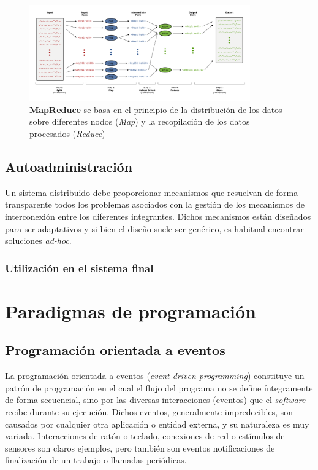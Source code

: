 \begin{figure}[H]
  \centering
  \includegraphics[width=0.85\textwidth]{Chapter2/Figures/map-reduce}
  \caption[MapReduce]{\textbf{MapReduce} se basa en el principio de la distribución de los datos sobre diferentes nodos (\textit{Map}) y la recopilación de los datos procesados (\textit{Reduce})}
  \label{fig:mapreduce}
\end{figure}

\subsection{Autoadministración}
\label{teoria:autoadministracion}

Un sistema distribuido debe proporcionar mecanismos que resuelvan de forma transparente todos los problemas asociados con la gestión de los mecanismos de interconexión entre los diferentes integrantes. Dichos mecanismos están diseñados para ser adaptativos y si bien el diseño suele ser genérico, es habitual encontrar soluciones \textit{ad-hoc}.

\subsubsection{Utilización en el sistema final}

\section{Paradigmas de programación}

\subsection{Programación orientada a eventos}
\label{teoria:eventdriven}

La programación orientada a eventos (\textit{event-driven programming}) constituye un patrón de programación en el cual el flujo del programa no se define íntegramente de forma secuencial, sino por las diversas interacciones (eventos) que el \textit{software} recibe durante su ejecución. Dichos eventos, generalmente impredecibles, son causados por cualquier otra aplicación o entidad externa, y su naturaleza es muy variada. Interacciones de ratón o teclado, conexiones de red o estímulos de sensores son claros ejemplos, pero también son eventos notificaciones de finalización de un trabajo o llamadas periódicas.

